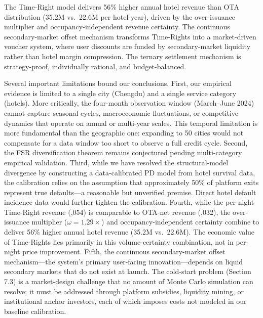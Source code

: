 \documentclass[12pt,a4paper]{article}
\begin{document}
The Time-Right model delivers 56\% higher annual hotel revenue than OTA distribution (\yen 35.2M vs.\ \yen 22.6M per hotel-year), driven by the over-issuance multiplier and occupancy-independent revenue certainty.
The continuous secondary-market offset mechanism transforms Time-Rights into a market-driven voucher system, where user discounts are funded by secondary-market liquidity rather than hotel margin compression.
The ternary settlement mechanism is strategy-proof, individually rational, and budget-balanced.

Several important limitations bound our conclusions.
First, our empirical evidence is limited to a single city (Chengdu) and a single service category (hotels). More critically, the four-month observation window (March--June 2024) cannot capture seasonal cycles, macroeconomic fluctuations, or competitive dynamics that operate on annual or multi-year scales. This temporal limitation is more fundamental than the geographic one: expanding to 50 cities would not compensate for a data window too short to observe a full credit cycle.
Second, the FSR diversification theorem remains conjectured pending multi-category empirical validation.
Third, while we have resolved the structural-model divergence by constructing a data-calibrated PD model from hotel survival data, the calibration relies on the assumption that approximately 50\% of platform exits represent true defaults---a reasonable but unverified premise. Direct hotel default incidence data would further tighten the calibration.
Fourth, while the per-night Time-Right revenue (,054) is comparable to OTA-net revenue (,032), the over-issuance multiplier ($\omega=1.29\times$) and occupancy-independent certainty combine to deliver 56\% higher annual hotel revenue (\yen 35.2M vs.\ \yen 22.6M). The economic value of Time-Rights lies primarily in this volume-certainty combination, not in per-night price improvement.
Fifth, the continuous secondary-market offset mechanism---the system's primary user-facing innovation---depends on liquid secondary markets that do not exist at launch. The cold-start problem (Section 7.3) is a market-design challenge that no amount of Monte Carlo simulation can resolve; it must be addressed through platform subsidies, liquidity mining, or institutional anchor investors, each of which imposes costs not modeled in our baseline calibration.
\end{document}
